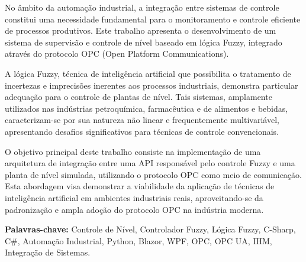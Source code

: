 \begin{resumo}
  \vspace{-15pt}
  
No âmbito da automação industrial, a integração entre sistemas de controle constitui uma necessidade fundamental para o monitoramento e controle eficiente de processos produtivos. Este trabalho apresenta o desenvolvimento de um sistema de supervisão e controle de nível baseado em lógica Fuzzy, integrado através do protocolo OPC (Open Platform Communications).

A lógica Fuzzy, técnica de inteligência artificial que possibilita o tratamento de incertezas e imprecisões inerentes aos processos industriais, demonstra particular adequação para o controle de plantas de nível. Tais sistemas, amplamente utilizados nas indústrias petroquímica, farmacêutica e de alimentos e bebidas, caracterizam-se por sua natureza não linear e frequentemente multivariável, apresentando desafios significativos para técnicas de controle convencionais.

O objetivo principal deste trabalho consiste na implementação de uma arquitetura de integração entre uma API responsável pelo controle Fuzzy e uma planta de nível simulada, utilizando o protocolo OPC como meio de comunicação. Esta abordagem visa demonstrar a viabilidade da aplicação de técnicas de inteligência artificial em ambientes industriais reais, aproveitando-se da padronização e ampla adoção do protocolo OPC na indústria moderna.


  \textbf{Palavras-chave:} Controle de Nível, Controlador Fuzzy, Lógica Fuzzy, C-Sharp, C\#, Automação Industrial, Python, Blazor, WPF, OPC, OPC UA, IHM, Integração de Sistemas.
\end{resumo}
